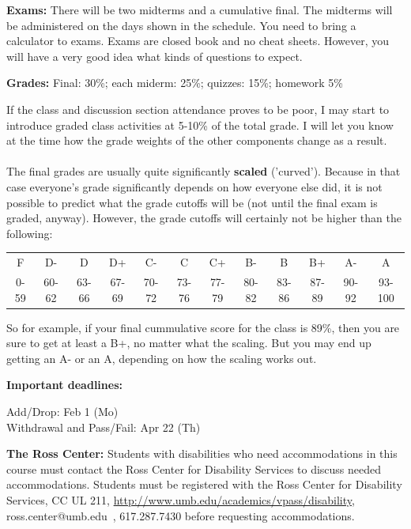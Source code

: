 \documentclass[12pt]{article}
\newcommand{\urhl}[1]{\href{#1}{#1}}
\begin{document}
\vfill
\textbf{Exams:}  There will be two midterms and a cumulative final. The midterms will be administered on the days shown in the schedule. You need to bring a calculator to exams. Exams are closed book and no cheat sheets. However, you will have a very good idea what kinds of questions to expect.

\vfill
\textbf{Grades:}
Final: 30\%; each miderm: 25\%; quizzes: 15\%; homework 5\%
%

If the class and discussion section attendance proves to be poor, I may start to introduce graded class activities at 5-10\% of the total grade. I will let you know at the time how the grade weights of the other components change as a result.
\\
\mbox{}\\
The final grades are usually quite significantly \textbf{scaled} ('curved'). Because in that case everyone's grade significantly depends on how everyone else did, it is not possible to predict what the grade cutoffs will be (not until the final exam is graded, anyway). However, the grade cutoffs will certainly not be higher than the following:

\begin{tabular}{cccccccccccc}
F & D- & D & D+ & C- & C & C+ & B- & B & B+ & A- & A\\
0-59 & 60-62 & 63-66 & 67-69 & 70-72 & 73-76 & 77-79 & 80-82 & 83-86 & 87-89 & 90-92 & 93-100
\end{tabular}

So for example, if your final cummulative score for the class is 89\%, then you are sure to get at least a B+, no matter what the scaling. But you may end up getting an A- or an A, depending on how the scaling works out.

\vfill
\begin{minipage}[t]{\widthof{\textbf{Important deadlines:}}}
\textbf{Important deadlines:}
\end{minipage}\hspace{1em}
\begin{minipage}[t]{\textwidth-\widthof{websitewebsite}}
Add/Drop: Feb 1 (Mo) \\
Withdrawal and Pass/Fail: Apr 22 (Th)
\end{minipage}

\vfill
\textbf{The Ross Center:} Students with disabilities who need accommodations in this course must contact the Ross Center for Disability Services to discuss needed accommodations. Students must be registered with the Ross Center for Disability Services, CC UL 211, \urhl{http://www.umb.edu/academics/vpass/disability}, ross.center@umb.edu~, 617.287.7430 before requesting accommodations.
\end{document}

